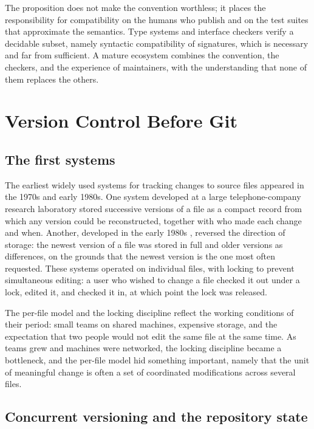\documentclass[11pt,twoside,openright]{book}
\theoremstyle{plain}
\theoremstyle{definition}
\theoremstyle{remark}
\begin{document}
The proposition does not make the convention worthless; it places the responsibility for compatibility on the humans who publish and on the test suites that approximate the semantics. Type systems and interface checkers verify a decidable subset, namely syntactic compatibility of signatures, which is necessary and far from sufficient. A mature ecosystem combines the convention, the checkers, and the experience of maintainers, with the understanding that none of them replaces the others.

\chapter{Version Control Before Git}\label{ch:vcsbefore}

\section{The first systems}

The earliest widely used systems for tracking changes to source files appeared in the 1970s and early 1980s. One system developed at a large telephone-company research laboratory \cite{rochkind1975} stored successive versions of a file as a compact record from which any version could be reconstructed, together with who made each change and when. Another, developed in the early 1980s \cite{tichy1982}, reversed the direction of storage: the newest version of a file was stored in full and older versions as differences, on the grounds that the newest version is the one most often requested. These systems operated on individual files, with locking to prevent simultaneous editing: a user who wished to change a file checked it out under a lock, edited it, and checked it in, at which point the lock was released.

The per-file model and the locking discipline reflect the working conditions of their period: small teams on shared machines, expensive storage, and the expectation that two people would not edit the same file at the same time. As teams grew and machines were networked, the locking discipline became a bottleneck, and the per-file model hid something important, namely that the unit of meaningful change is often a set of coordinated modifications across several files.

\section{Concurrent versioning and the repository state}
\end{document}
